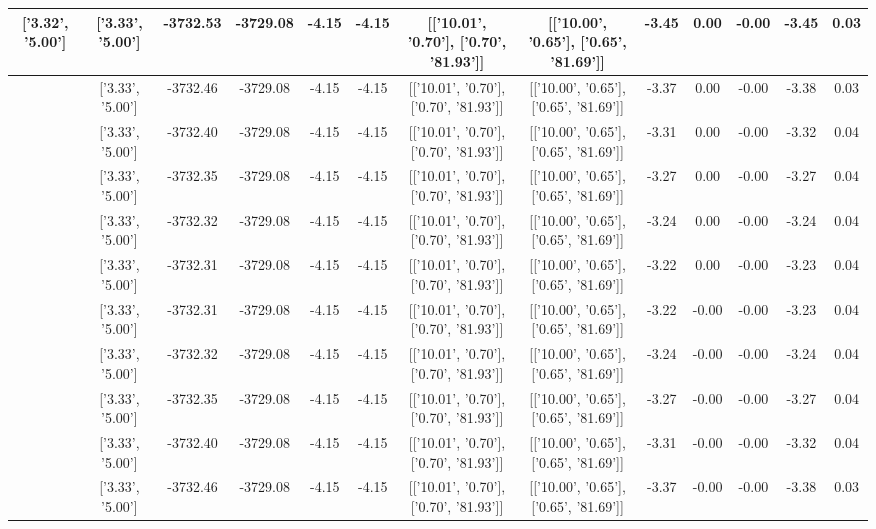 \begin{table}[htbp]
\begin{adjustbox}{angle=90}
\begin{tabular}{|c|c|c|c|c|c|c|c|c|c|c|c|c|}
 ['3.32', '5.00'] & ['3.33', '5.00'] & -3732.53 & -3729.08 & -4.15 & -4.15 & [['10.01', '0.70'], ['0.70', '81.93']] & [['10.00', '0.65'], ['0.65', '81.69']] & -3.45 & 0.00 & -0.00 & -3.45 & 0.03\\ \hline
 ['3.33', '5.00'] & ['3.33', '5.00'] & -3732.46 & -3729.08 & -4.15 & -4.15 & [['10.01', '0.70'], ['0.70', '81.93']] & [['10.00', '0.65'], ['0.65', '81.69']] & -3.37 & 0.00 & -0.00 & -3.38 & 0.03\\ \hline
 ['3.33', '5.00'] & ['3.33', '5.00'] & -3732.40 & -3729.08 & -4.15 & -4.15 & [['10.01', '0.70'], ['0.70', '81.93']] & [['10.00', '0.65'], ['0.65', '81.69']] & -3.31 & 0.00 & -0.00 & -3.32 & 0.04\\ \hline
 ['3.33', '5.00'] & ['3.33', '5.00'] & -3732.35 & -3729.08 & -4.15 & -4.15 & [['10.01', '0.70'], ['0.70', '81.93']] & [['10.00', '0.65'], ['0.65', '81.69']] & -3.27 & 0.00 & -0.00 & -3.27 & 0.04\\ \hline
 ['3.33', '5.00'] & ['3.33', '5.00'] & -3732.32 & -3729.08 & -4.15 & -4.15 & [['10.01', '0.70'], ['0.70', '81.93']] & [['10.00', '0.65'], ['0.65', '81.69']] & -3.24 & 0.00 & -0.00 & -3.24 & 0.04\\ \hline
 ['3.33', '5.00'] & ['3.33', '5.00'] & -3732.31 & -3729.08 & -4.15 & -4.15 & [['10.01', '0.70'], ['0.70', '81.93']] & [['10.00', '0.65'], ['0.65', '81.69']] & -3.22 & 0.00 & -0.00 & -3.23 & 0.04\\ \hline
 ['3.33', '5.00'] & ['3.33', '5.00'] & -3732.31 & -3729.08 & -4.15 & -4.15 & [['10.01', '0.70'], ['0.70', '81.93']] & [['10.00', '0.65'], ['0.65', '81.69']] & -3.22 & -0.00 & -0.00 & -3.23 & 0.04\\ \hline
 ['3.33', '5.01'] & ['3.33', '5.00'] & -3732.32 & -3729.08 & -4.15 & -4.15 & [['10.01', '0.70'], ['0.70', '81.93']] & [['10.00', '0.65'], ['0.65', '81.69']] & -3.24 & -0.00 & -0.00 & -3.24 & 0.04\\ \hline
 ['3.33', '5.01'] & ['3.33', '5.00'] & -3732.35 & -3729.08 & -4.15 & -4.15 & [['10.01', '0.70'], ['0.70', '81.93']] & [['10.00', '0.65'], ['0.65', '81.69']] & -3.27 & -0.00 & -0.00 & -3.27 & 0.04\\ \hline
 ['3.33', '5.01'] & ['3.33', '5.00'] & -3732.40 & -3729.08 & -4.15 & -4.15 & [['10.01', '0.70'], ['0.70', '81.93']] & [['10.00', '0.65'], ['0.65', '81.69']] & -3.31 & -0.00 & -0.00 & -3.32 & 0.04\\ \hline
 ['3.34', '5.01'] & ['3.33', '5.00'] & -3732.46 & -3729.08 & -4.15 & -4.15 & [['10.01', '0.70'], ['0.70', '81.93']] & [['10.00', '0.65'], ['0.65', '81.69']] & -3.37 & -0.00 & -0.00 & -3.38 & 0.03\\ \hline

\end{tabular}
\end{adjustbox}
\end{table}
